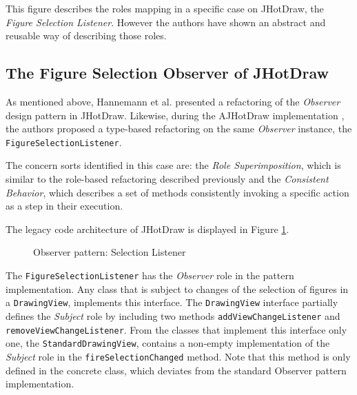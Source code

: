 This figure describes the roles mapping in a specific case on JHotDraw, the \textit{Figure Selection Listener}.
However the authors have shown an abstract and reusable way of describing those roles.

\subsection{The Figure Selection Observer of JHotDraw}\label{The Figure Selection Observer of JHotDraw}
As mentioned above, Hannemann et al. \cite{hannemann2005role} presented a refactoring of the \textit{Observer} design pattern in JHotDraw.
Likewise, during the AJHotDraw implementation\cite{marin2005approach} \cite{hannemann2005role}, the authors proposed a type-based refactoring on the same \textit{Observer} instance, the \texttt{FigureSelectionListener}.

The concern sorts identified in this case are: the \textit{Role Superimposition}, which is similar to the role-based refactoring described previously and the \textit{Consistent Behavior}, which describes a set of methods consistently invoking a specific action as a step in their execution.

The legacy code architecture of JHotDraw is displayed in Figure \ref{fig:Selection_Listener}.

\begin{figure}[H]
	\centering
  	\caption{Observer pattern: Selection Listener \cite{marin2005approach}}
  	\label{fig:Selection_Listener}
\end{figure}

The \texttt{FigureSelectionListener} has the \textit{Observer} role in the pattern implementation. 
Any class that is subject to changes of the selection of figures in a \texttt{DrawingView}, implements this interface. 
The \texttt{DrawingView} interface partially defines the \textit{Subject} role by including two methods \texttt{addViewChangeListener} and \texttt{removeViewChangeListener}.
From the classes that implement this interface only one, the \texttt{StandardDrawingView}, contains a non-empty implementation of the \textit{Subject} role in the \texttt{fireSelectionChanged} method.
Note that this method is only defined in the concrete class, which deviates from the standard Observer pattern implementation.

